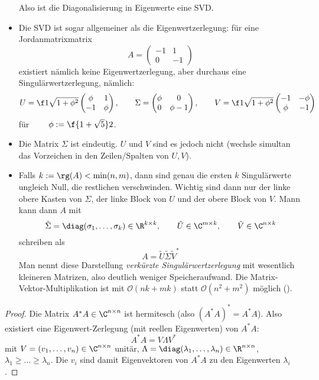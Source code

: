 \documentclass[11pt]{scrartcl}
\begin{document}
\begin{st}
\begin{note}
\begin{itemize}
				Also ist die Diagonalisierung in Eigenwerte eine SVD.
			\item
				Die SVD ist sogar allgemeiner als die Eigenwertzerlegung:
				für eine Jordanmatrixmatrix
				\[
					A = \begin{pmatrix}
						-1 & 1 \\
						0 & -1
					\end{pmatrix}
				\]
				existiert nämlich keine Eigenwertzerlegung, aber durchaus eine Singulärwertzerlegung, nämlich:
				\[
					U = \f 1{\sqrt{1+\phi^2}} \begin{pmatrix}
						\phi & 1 \\
						-1 & \phi
					\end{pmatrix}, \qquad
					\Sigma = \begin{pmatrix}
						\phi & 0 \\
						0 & \phi -1
					\end{pmatrix}, \qquad 
					V = \f 1{\sqrt{1+\phi^2}} \begin{pmatrix}
						-1 & -\phi \\
						\phi & - 1
					\end{pmatrix}
				\]
				für $\qquad \phi := \f {1+\sqrt 5}2$.
			\item
				Die Matrix $\Sigma$ ist eindeutig. 
				$U$ und $V$ sind es jedoch nicht (wechsle simultan das Vorzeichen in den Zeilen/Spalten von $U,V$).
			\item
				Falls $k := \rg(A) < \min(n,m)$, dann sind genau die ersten $k$ Singulärwerte ungleich Null, die restlichen verschwinden.
				Wichtig sind dann nur der linke obere Kasten von $\Sigma$, der linke Block von $U$ und der obere Block von $V$.
				Mann kann dann $A$ mit
				\[
					\tilde \Sigma = \diag(\sigma_1,\dotsc,\sigma_k) \in \R^{k\times k}
					, \qquad 
					\tilde U \in \C^{m\times k}
					, \qquad 
					\tilde V \in \C^{n\times k}
				\]
				schreiben als
				\[
					A = \tilde U \tilde \Sigma \tilde V^*
				\]
				Man nennt diese Darstellung \emph{verkürzte Singulärwertzerlegung} mit wesentlich kleineren Matrizen, also deutlich weniger Speicheraufwand.
				Die Matrix-Vektor-Multiplikation ist mit $\mathcal O(nk+mk)$ statt $\mathcal O(n^2 + m^2)$ möglich ().
		\end{itemize}
	\end{note}
	\begin{proof}
		Die Matrix $A^*A \in \C^{n\times n}$ ist hermitesch (also $(A^*A)^*=A^*A$).
		Also existiert eine Eigenwert-Zerlegung (mit reellen Eigenwerten) von $A^*A$:
		\[
			A^*A = V\Lambda V^*
		\]
		mit $V=(v_1,\dotsc, v_n)\in \C^{n\times n}$ unitär, $\Lambda = \diag(\lambda_1,\dotsc,\lambda_n) \in \R^{n\times n}$, $\lambda_1\ge \dotsc \ge \lambda_n$.
		Die $v_i$ sind damit Eigenvektoren von $A^*A$ zu den Eigenwerten $\lambda_i$.


\end{proof}
\end{st}
\end{document}
